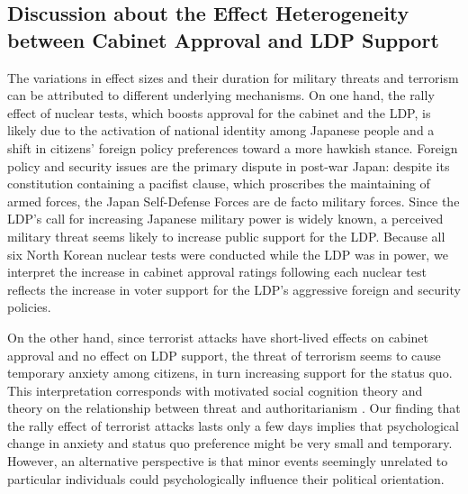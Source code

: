 \documentclass[12pt,letterpaper]{scrartcl}
\begin{document}
\singlespacing
\subsection{Discussion about the Effect Heterogeneity between Cabinet Approval and LDP Support}\label{app:subsec:heterogeneity}
\doublespacing

The variations in effect sizes and their duration for military threats and terrorism can be attributed to different underlying mechanisms. On one hand, the rally effect of nuclear tests, which boosts approval for the cabinet and the LDP, is likely due to the activation of national identity among Japanese people and a shift in citizens' foreign policy preferences toward a more hawkish stance. Foreign policy and security issues are the primary dispute in post-war Japan: despite its constitution containing a pacifist clause, which proscribes the maintaining of armed forces, the Japan Self-Defense Forces are de facto military forces. Since the LDP's call for increasing Japanese military power is widely known, a perceived military threat seems likely to increase public support for the LDP. Because all six North Korean nuclear tests were conducted while the LDP was in power, we interpret the increase in cabinet approval ratings following each nuclear test reflects the increase in voter support for the LDP's aggressive foreign and security policies.

On the other hand, since terrorist attacks have short-lived effects on cabinet approval and no effect on LDP support, the threat of terrorism seems to cause temporary anxiety among citizens, in turn increasing support for the status quo. This interpretation corresponds with motivated social cognition theory \citep{Jost2003PsycholBull} and theory on the relationship between threat and authoritarianism \citep{Doty1991JPSP}. Our finding that the rally effect of terrorist attacks lasts only a few days implies that psychological change in anxiety and status quo preference might be very small and temporary. However, an alternative perspective is that minor events seemingly unrelated to particular individuals could psychologically influence their political orientation.

\clearpage


\end{document}
